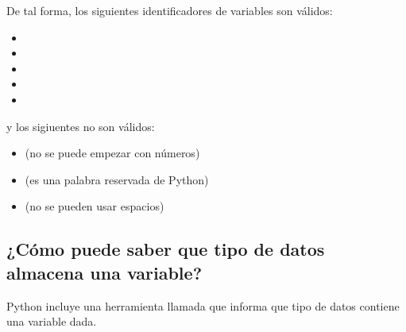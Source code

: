 \documentclass[a5paper,9pt,spanish]{sphinxmanual}
\begin{document}
\sphinxAtStartPar
De tal forma, los siguientes identificadores de variables son válidos:
\begin{itemize}
\item {} 
\sphinxAtStartPar
{}

\item {} 
\sphinxAtStartPar
{}

\item {} 
\sphinxAtStartPar
{}

\item {} 
\sphinxAtStartPar
{}

\item {} 
\sphinxAtStartPar
{}

\end{itemize}

\sphinxAtStartPar
y los sigiuentes no son válidos:
\begin{itemize}
\item {} 
\sphinxAtStartPar
{} (no se puede empezar con números)

\item {} 
\sphinxAtStartPar
{}  (es una palabra reservada de Python)

\item {} 
\sphinxAtStartPar
{} (no se pueden usar espacios)

\end{itemize}


\subsection{¿Cómo puede saber que tipo de datos almacena una variable?}
\label{\detokenize{interactivo:como-puede-saber-que-tipo-de-datos-almacena-una-variable}}
\sphinxAtStartPar
Python incluye una herramienta llamada  que informa
que tipo de datos contiene una variable dada.

\begin{sphinxVerbatim}[commandchars=\\\{\}]
  
\end{sphinxVerbatim}
\end{document}
